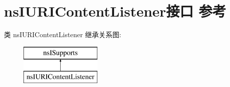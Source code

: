 \hypertarget{interfacens_i_u_r_i_content_listener}{}\section{ns\+I\+U\+R\+I\+Content\+Listener接口 参考}
\label{interfacens_i_u_r_i_content_listener}
类 ns\+I\+U\+R\+I\+Content\+Listener 继承关系图\+:\begin{figure}[H]
\begin{center}
\leavevmode
\includegraphics[height=2.000000cm]{interfacens_i_u_r_i_content_listener}
\end{center}
\end{figure}
